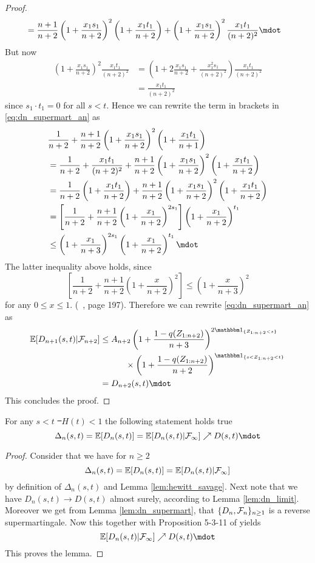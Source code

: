 \begin{lemma}
\begin{proof}
\begin{align*}
			&= \frac{n+1}{n+2}\left(1+\frac{x_1s_1}{n+2}\right)^{2}\left(1+\frac{x_1t_1}{n+2}\right) + \left(1+\frac{x_1s_1}{n+2}\right)^{2}\frac{x_1t_1}{(n+2)^2}\mdot 
		\end{align*}
		But now 
		\begin{align*}
			\left(1+\frac{x_1s_1}{n+2}\right)^{2}\frac{x_1t_1}{(n+2)^2} &= \left(1+2\frac{x_1s_1}{n+2}+\frac{x^2_1s_1}{(n+2)^2}\right)\frac{x_1t_1}{(n+2)^2}\\
			&= \frac{x_1t_1}{(n+2)^2}
		\end{align*}
		since $s_1\cdot t_1=0$ for all $s<t$. Hence we can rewrite the term in brackets in \eqref{eq:dn_supermart_an} as 
		\begin{align*}
			&\frac{1}{n+2} + \frac{n+1}{n+2}\left(1+\frac{x_1s_1}{n+2}\right)^{2} \left(1+\frac{x_1t_1}{n+1}\right) \\
			&=\frac{1}{n+2} + \frac{x_1t_1}{(n+2)^2} + \frac{n+1}{n+2}\left(1+\frac{x_1s_1}{n+2}\right)^{2}\left(1+\frac{x_1t_1}{n+2}\right)\\
			&=\frac{1}{n+2}\left(1+\frac{x_1t_1}{n+2}\right) + \frac{n+1}{n+2}\left(1+\frac{x_1s_1}{n+2}\right)^{2}\left(1+\frac{x_1t_1}{n+2}\right)\\
			&=\left[\frac{1}{n+2} + \frac{n+1}{n+2}\left(1+\frac{x_1}{n+2}\right)^{2s_1}\right]\left(1+\frac{x_1}{n+2}\right)^{t_1}\\
			&\leq \left(1+\frac{x_1}{n+3}\right)^{2s_1}\left(1+\frac{x_1}{n+2}\right)^{t_1}\mdot 
		\end{align*}
		The latter inequality above holds, since 
		$$\left[\frac{1}{n+2} + \frac{n+1}{n+2}\left(1+\frac{x}{n+2}\right)^{2}\right] \leq \left(1+\frac{x}{n+3}\right)^{2}$$
		for any $0\leq x\leq 1$. (\cf\ \cite{bose1999strong}, page 197). Therefore we can rewrite \eqref{eq:dn_supermart_an} as
		\begin{align*}
			\E[D_{n+1}(s,t)| \F_{n+2}]	&\leq A_{n+2} \left(1+\frac{1-q(Z_{1:n+2})}{n+3}\right)^{2\I{Z_{1:n+2}<s}} \\
			&\qquad\quad \times \left(1+\frac{1-q(Z_{1:n+2})}{n+2}\right)^{\I{s<Z_{1:n+2} <t}}\\
			&= D_{n+2}(s,t)\mdot
		\end{align*}		
		This concludes the proof.
	\end{proof}
\end{lemma}
%
\begin{lemma}For any $s<t$ \st\ $H(t)<1$ the following statement holds true
	$$\Delta_{n}(s,t) = \E[D_n(s,t)] = \E[D_n(s,t)|\F_\infty] \nearrow D(s,t)\mdot$$
	\label{lem:neveu}
	\begin{proof}
		Consider that we have for $n\geq 2$
		$$\Delta_{n}(s,t) = \mathbb{E}[D_n(s,t)] = \mathbb{E}[D_n(s,t)|\mathcal{F}_\infty] $$
		by definition of $\Delta_{n}(s,t)$ and Lemma \ref{lem:hewitt_savage}. Next note that we have $D_n(s,t) \to D(s,t)$ almost surely, according to Lemma \ref{lem:dn_limit}. Moreover we get from Lemma \ref{lem:dn_supermart}, that $\{D_n,\mathcal{F}_n\}_{n\geq 1}$ is a reverse supermartingale. Now this together with Proposition 5-3-11 of \cite{neveu1975discrete} yields
		$$\E[D_n(s,t)|\F_\infty] \nearrow D(s,t)\mdot$$
		This proves the lemma.
	\end{proof}
\end{lemma}
%
%
%
%
